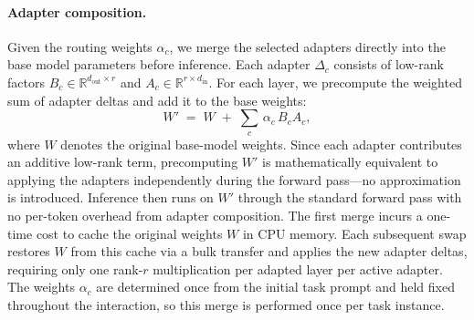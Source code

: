 \paragraph{Adapter composition.}
Given the routing weights $\alpha_c$, we merge the selected adapters directly into the base model parameters before inference. Each adapter $\Delta_c$ consists of low-rank factors $B_c \in \mathbb{R}^{d_{\text{out}} \times r}$ and $A_c \in \mathbb{R}^{r \times d_{\text{in}}}$. For each layer, we precompute the weighted sum of adapter deltas and add it to the base weights:
\begin{equation}
W' \;=\; W \;+\; \sum_{c}\, \alpha_c \, B_c A_c,
\label{eq:compose}
\end{equation}
where $W$ denotes the original base-model weights. Since each adapter contributes an additive low-rank term, precomputing $W'$ is mathematically equivalent to applying the adapters independently during the forward pass---no approximation is introduced. Inference then runs on $W'$ through the standard forward pass with no per-token overhead from adapter composition. The first merge incurs a one-time cost to cache the original weights $W$ in CPU memory. Each subsequent swap restores $W$ from this cache via a bulk transfer and applies the new adapter deltas, requiring only one rank-$r$ multiplication per adapted layer per active adapter. The weights $\alpha_c$ are determined once from the initial task prompt and held fixed throughout the interaction, so this merge is performed once per task instance.
